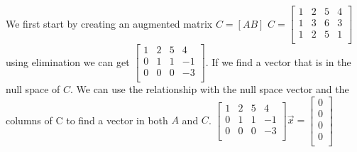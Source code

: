				We first start by creating an augmented matrix $C=[AB]$ $C=
				\begin{bmatrix}
				    1 & 2 & 5 & 4 \\
				    1 & 3 & 6 & 3 \\
				    1 & 2 & 5 & 1 \\
				\end{bmatrix}$ using elimination we can get $\begin{bmatrix}
				    1 & 2 & 5 & 4 \\
				    0 & 1 & 1 & -1 \\
				    0 & 0 & 0 & -3 \\
				\end{bmatrix}$. If we find a vector that is in the null space of $C$. We can use the relationship with the null space vector and the columns of C to find a vector in both $A$ and $C$. 
				\newline
				$\begin{bmatrix}
				    1 & 2 & 5 & 4 \\
				    0 & 1 & 1 & -1 \\
				    0 & 0 & 0 & -3 \\
				\end{bmatrix}\vec{x}=\begin{bmatrix}
				    0 \\ 0 \\ 0 \\ 0 \\
				\end{bmatrix}$
				
